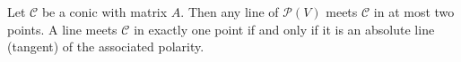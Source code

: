 Let $\mathcal{C}$ be a conic with matrix $A$. Then any line of $\mathcal{P}(V)$ meets $\mathcal{C}$ in at most two points. A line meets $\mathcal{C}$ in exactly one point if and only if it is an absolute line (tangent) of the associated polarity.
